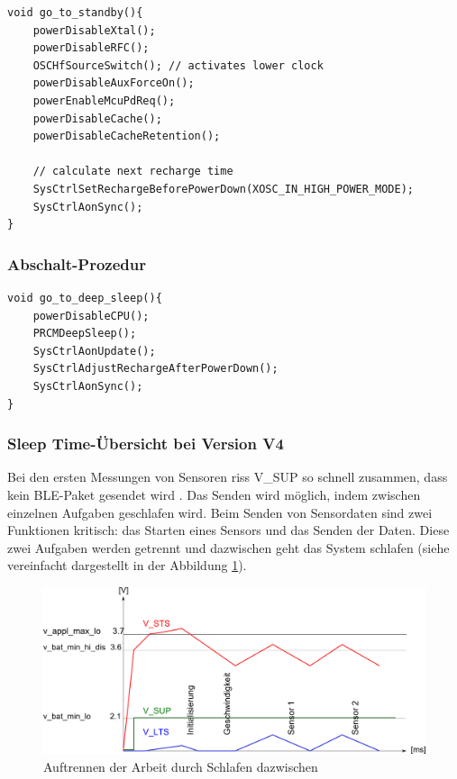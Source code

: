 \begin{minipage}[t]{1\textwidth}
\small\begin{verbatim}
void go_to_standby(){ 
    powerDisableXtal();
    powerDisableRFC();
    OSCHfSourceSwitch(); // activates lower clock
    powerDisableAuxForceOn();
    powerEnableMcuPdReq();
    powerDisableCache();
    powerDisableCacheRetention();

    // calculate next recharge time
    SysCtrlSetRechargeBeforePowerDown(XOSC_IN_HIGH_POWER_MODE);
    SysCtrlAonSync();
} 
    \end{verbatim}\normalsize
\end{minipage} 	    

\subsubsection{Abschalt-Prozedur}
\label{ausschalten}

\begin{minipage}[t]{1\textwidth}
\small\begin{verbatim}
void go_to_deep_sleep(){ 
    powerDisableCPU();
    PRCMDeepSleep();
    SysCtrlAonUpdate();
    SysCtrlAdjustRechargeAfterPowerDown();
    SysCtrlAonSync();
}
\end{verbatim}\normalsize
\end{minipage}

\subsubsection{Sleep Time-Übersicht bei Version V4}
	    
Bei den ersten Messungen von Sensoren riss V\_SUP so schnell zusammen, dass kein BLE-Paket gesendet wird . Das Senden wird möglich, indem zwischen einzelnen Aufgaben geschlafen wird. Beim Senden von Sensordaten sind zwei Funktionen kritisch: das Starten eines Sensors und das Senden der Daten. Diese zwei Aufgaben werden getrennt und dazwischen geht das System schlafen (siehe vereinfacht dargestellt in der Abbildung \ref{schnarch}).

\begin{figure}[ht]
  \includegraphics[width=1.0\textwidth]{3Vorgehen/imag/HIGH_ENERGY.png}
  \caption{Auftrennen der Arbeit durch Schlafen dazwischen}
  \label{schnarch}
\end{figure}


